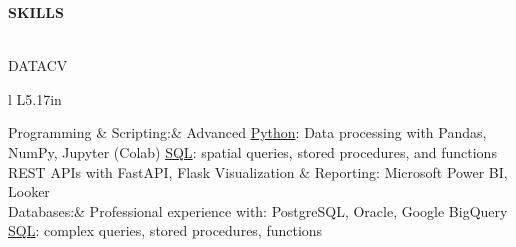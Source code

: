 \documentclass[letterpaper]{article}
\newcommand{\lineunder} {
        \vspace*{-8pt} \\
        \hspace*{-18pt} \hrulefill \\
    }
\newcommand{\header} [1] {
        \vspace{9pt}
        {\hspace*{-18pt}\vspace*{6pt} \large \textbf {#1}}
        \vspace*{-6pt} \lineunder
        \vspace{2pt}
    }
\newenvironment{skillslist}
        {
            \hspace*{-0.07in}\begin{tabular}[t]{ l L{5.17in} }
        }{
            \end{tabular}
        }
\newcommand{\impt}[1]{\uline{#1}}
\begin{document}
\header{SKILLS}
    \begin{taggedblock}{DATACV}
        \begin{skillslist}
            Programming \& Scripting:&
                Advanced \impt{Python}: Data processing with Pandas, NumPy, Jupyter (Colab) \linebreak
                \impt{SQL}: spatial queries, stored procedures, and functions \linebreak
                REST APIs with FastAPI, Flask \linebreak
                Visualization \& Reporting: Microsoft Power BI, Looker \linebreak
                \\
            Databases:&
                Professional experience with: PostgreSQL, Oracle, Google BigQuery \linebreak
                \impt{SQL}: complex queries, stored procedures, functions \linebreak
                \\

\end{skillslist}
\end{taggedblock}
\end{document}
